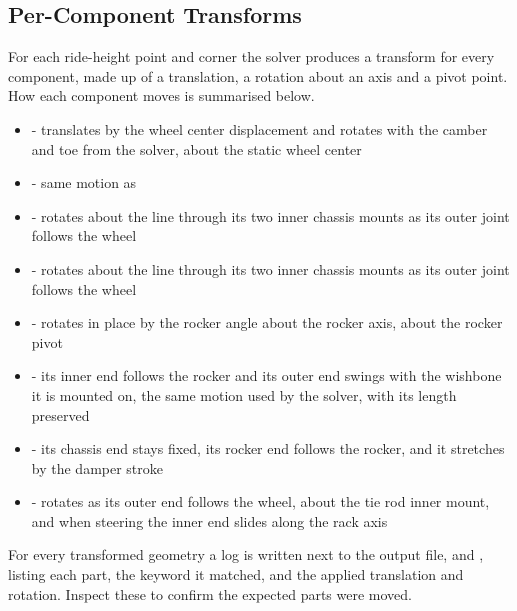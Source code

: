 \subsection{Per-Component Transforms}
For each ride-height point and corner the solver produces a transform for every component, made up of a translation, a rotation about an axis and a pivot point. How each component moves is summarised below.
\begin{itemize}
    \item {} - translates by the wheel center displacement and rotates with the camber and toe from the solver, about the static wheel center

    \item {} - same motion as 

    \item {} - rotates about the line through its two inner chassis mounts as its outer joint follows the wheel

    \item {} - rotates about the line through its two inner chassis mounts as its outer joint follows the wheel

    \item {} - rotates in place by the rocker angle about the rocker axis, about the rocker pivot

    \item {} - its inner end follows the rocker and its outer end swings with the wishbone it is mounted on, the same motion used by the solver, with its length preserved

    \item {} - its chassis end stays fixed, its rocker end follows the rocker, and it stretches by the damper stroke

    \item {} - rotates as its outer end follows the wheel, about the tie rod inner mount, and when steering the inner end slides along the rack axis
\end{itemize}
For every transformed geometry a log is written next to the output file,  and , listing each part, the keyword it matched, and the applied translation and rotation. Inspect these to confirm the expected parts were moved.

